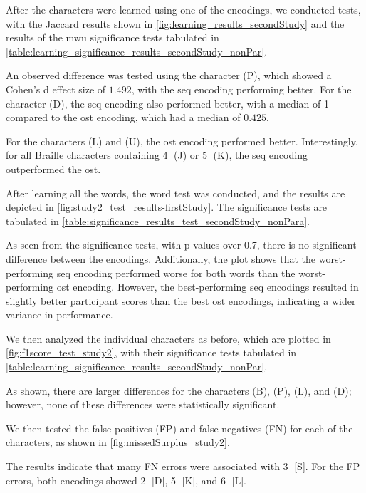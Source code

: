 After the characters were learned using one of the encodings, we conducted tests, with the Jaccard results shown in \autoref{fig:learning_results_secondStudy} and the results of the \gls{mwu} significance tests tabulated in \autoref{table:learning_significance_results_secondStudy_nonPar}.

An observed difference was tested using the character (P), which showed a Cohen's d effect size of $1.492$, with the \gls{seq} encoding performing better. For the character (D), the \gls{seq} encoding also performed better, with a median of 1 compared to the \gls{ost} encoding, which had a median of $0.425$.

For the characters (L) and (U), the \gls{ost} encoding performed better. Interestingly, for all Braille characters containing \textcircled{4} (J) or \textcircled{5} (K), the \gls{seq} encoding outperformed the \gls{ost}.


After learning all the words, the word test was conducted, and the results are depicted in \autoref{fig:study2_test_results-firstStudy}. The significance tests are tabulated in \autoref{table:significance_results_test_secondStudy_nonPara}.

As seen from the significance tests, with p-values over 0.7, there is no significant difference between the encodings. Additionally, the plot shows that the worst-performing \gls{seq} encoding performed worse for both words than the worst-performing \gls{ost} encoding. However, the best-performing \gls{seq} encodings resulted in slightly better participant scores than the best \gls{ost} encodings, indicating a wider variance in performance.

We then analyzed the individual characters as before, which are plotted in \autoref{fig:f1score_test_study2}, with their significance tests tabulated in \autoref{table:learning_significance_results_secondStudy_nonPar}.

As shown, there are larger differences for the characters (B), (P), (L), and (D); however, none of these differences were statistically significant.


We then tested the false positives (FP) and false negatives (FN) for each of the characters, as shown in \autoref{fig:missedSurplus_study2}.

The results indicate that many FN errors were associated with \textcircled{3} [S]. For the FP errors, both encodings showed \textcircled{2} [D], \textcircled{5} [K], and \textcircled{6} [L].

